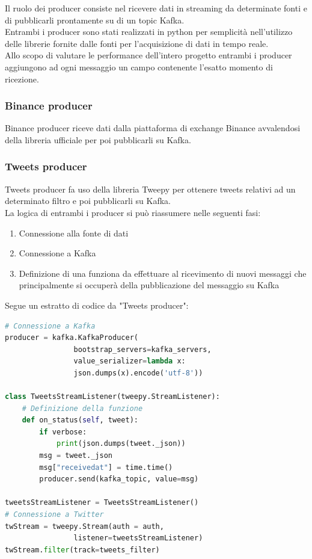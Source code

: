 Il ruolo dei producer consiste nel ricevere dati in streaming da determinate fonti e di
pubblicarli prontamente su di un topic Kafka.
\\
Entrambi i producer sono stati realizzati in python per semplicità nell'utilizzo delle
librerie fornite dalle fonti per l'acquisizione di dati in tempo reale.
\\
Allo scopo di valutare le performance dell'intero progetto entrambi i producer aggiungono
ad ogni messaggio un campo contenente l'esatto momento di ricezione.

\subsubsection{Binance producer}

Binance producer riceve dati dalla piattaforma di exchange Binance \cite{binance}
avvalendosi della libreria ufficiale per poi pubblicarli su Kafka.

\subsubsection{Tweets producer}

Tweets producer fa uso della libreria Tweepy \cite{tweepy} per ottenere tweets relativi
ad un determinato filtro e poi pubblicarli su Kafka.
\\
La logica di entrambi i producer si può riassumere nelle seguenti fasi:
\begin{enumerate}
    \item Connessione alla fonte di dati
    \item Connessione a Kafka
    \item Definizione di una funziona da effettuare al ricevimento di nuovi messaggi che
          principalmente si occuperà della pubblicazione del messaggio su Kafka
\end{enumerate}

Segue un estratto di codice da "Tweets producer":

\begin{lstlisting}[language=python,firstnumber=1]
# Connessione a Kafka
producer = kafka.KafkaProducer(
                bootstrap_servers=kafka_servers,
                value_serializer=lambda x: 
                json.dumps(x).encode('utf-8'))

class TweetsStreamListener(tweepy.StreamListener):
    # Definizione della funzione
    def on_status(self, tweet):
        if verbose:
            print(json.dumps(tweet._json))
        msg = tweet._json
        msg["receivedat"] = time.time()
        producer.send(kafka_topic, value=msg)

tweetsStreamListener = TweetsStreamListener()
# Connessione a Twitter
twStream = tweepy.Stream(auth = auth,
                listener=tweetsStreamListener)
twStream.filter(track=tweets_filter)
\end{lstlisting}

